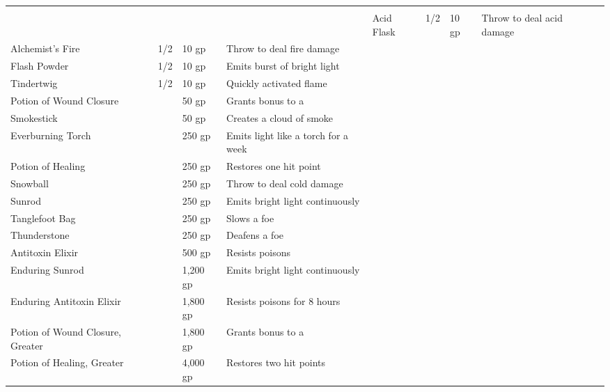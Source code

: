 
\begin{longtabuwrapper}
\begin{longtabu}{l l l X l}
 \\
 &  &  &  &  \tableheaderrule
Acid Flask & 1/2 & 10 gp & Throw to deal acid damage & \pageref{item:Acid Flask} \\
Alchemist's Fire & 1/2 & 10 gp & Throw to deal fire damage & \pageref{item:Alchemist's Fire} \\
Flash Powder & 1/2 & 10 gp & Emits burst of bright light & \pageref{item:Flash Powder} \\
Tindertwig & 1/2 & 10 gp & Quickly activated flame & \pageref{item:Tindertwig} \\
Potion of Wound Closure &  & 50 gp & Grants  bonus to a  & \pageref{item:Potion of Wound Closure} \\
Smokestick &  & 50 gp & Creates a cloud of smoke & \pageref{item:Smokestick} \\
Everburning Torch &  & 250 gp & Emits light like a torch for a week & \pageref{item:Everburning Torch} \\
Potion of Healing &  & 250 gp & Restores one hit point & \pageref{item:Potion of Healing} \\
Snowball &  & 250 gp & Throw to deal cold damage & \pageref{item:Snowball} \\
Sunrod &  & 250 gp & Emits bright light continuously & \pageref{item:Sunrod} \\
Tanglefoot Bag &  & 250 gp & Slows a foe & \pageref{item:Tanglefoot Bag} \\
Thunderstone &  & 250 gp & Deafens a foe & \pageref{item:Thunderstone} \\
Antitoxin Elixir &  & 500 gp & Resists poisons & \pageref{item:Antitoxin Elixir} \\
Enduring Sunrod &  & 1,200 gp & Emits bright light continuously & \pageref{item:Enduring Sunrod} \\
Enduring Antitoxin Elixir &  & 1,800 gp & Resists poisons for 8 hours & \pageref{item:Enduring Antitoxin Elixir} \\
Potion of Wound Closure, Greater &  & 1,800 gp & Grants  bonus to a  & \pageref{item:Potion of Wound Closure, Greater} \\
Potion of Healing, Greater &  & 4,000 gp & Restores two hit points & \pageref{item:Potion of Healing, Greater} \\

\end{longtabu}
\end{longtabuwrapper}
